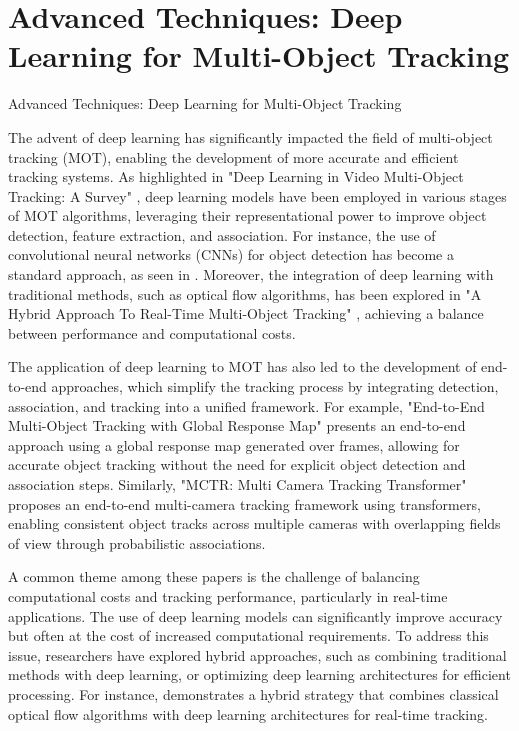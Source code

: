 \documentclass[conference]{IEEEtran}
\begin{document}
\section{Advanced Techniques: Deep Learning for Multi-Object Tracking}
Advanced Techniques: Deep Learning for Multi-Object Tracking

The advent of deep learning has significantly impacted the field of multi-object tracking (MOT), enabling the development of more accurate and efficient tracking systems. As highlighted in "Deep Learning in Video Multi-Object Tracking: A Survey" \cite{Deep Learning in Video Multi-Object Tracking: A Survey}, deep learning models have been employed in various stages of MOT algorithms, leveraging their representational power to improve object detection, feature extraction, and association. For instance, the use of convolutional neural networks (CNNs) for object detection has become a standard approach, as seen in \cite{End-to-End Multi-Object Tracking with Global Response Map}. Moreover, the integration of deep learning with traditional methods, such as optical flow algorithms, has been explored in "A Hybrid Approach To Real-Time Multi-Object Tracking" \cite{A Hybrid Approach To Real-Time Multi-Object Tracking}, achieving a balance between performance and computational costs.

The application of deep learning to MOT has also led to the development of end-to-end approaches, which simplify the tracking process by integrating detection, association, and tracking into a unified framework. For example, "End-to-End Multi-Object Tracking with Global Response Map" \cite{End-to-End Multi-Object Tracking with Global Response Map} presents an end-to-end approach using a global response map generated over frames, allowing for accurate object tracking without the need for explicit object detection and association steps. Similarly, "MCTR: Multi Camera Tracking Transformer" \cite{MCTR: Multi Camera Tracking Transformer} proposes an end-to-end multi-camera tracking framework using transformers, enabling consistent object tracks across multiple cameras with overlapping fields of view through probabilistic associations.

A common theme among these papers is the challenge of balancing computational costs and tracking performance, particularly in real-time applications. The use of deep learning models can significantly improve accuracy but often at the cost of increased computational requirements. To address this issue, researchers have explored hybrid approaches, such as combining traditional methods with deep learning, or optimizing deep learning architectures for efficient processing. For instance, \cite{A Hybrid Approach To Real-Time Multi-Object Tracking} demonstrates a hybrid strategy that combines classical optical flow algorithms with deep learning architectures for real-time tracking.
\end{document}
